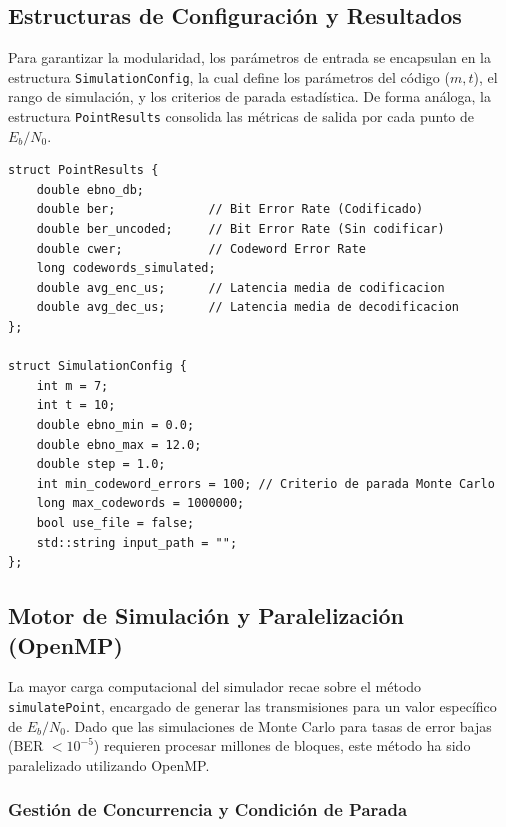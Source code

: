\subsection{Estructuras de Configuración y Resultados}

Para garantizar la modularidad, los parámetros de entrada se encapsulan en la estructura \texttt{SimulationConfig}, la cual define los parámetros del código ($m, t$), el rango de simulación, y los criterios de parada estadística. De forma análoga, la estructura \texttt{PointResults} consolida las métricas de salida por cada punto de $E_b/N_0$.

\begin{lstlisting}[style=CodigoCPP, caption={Definición de las estructuras \texttt{PointResults} y \texttt{SimulationConfig}, encargadas de almacenar las métricas de rendimiento y los parámetros de ejecución del simulador.}, label={lst:estructuras_simulacion}]
struct PointResults { 
    double ebno_db; 
    double ber;             // Bit Error Rate (Codificado)
    double ber_uncoded;     // Bit Error Rate (Sin codificar)
    double cwer;            // Codeword Error Rate
    long codewords_simulated; 
    double avg_enc_us;      // Latencia media de codificacion
    double avg_dec_us;      // Latencia media de decodificacion
};

struct SimulationConfig { 
    int m = 7; 
    int t = 10; 
    double ebno_min = 0.0; 
    double ebno_max = 12.0; 
    double step = 1.0; 
    int min_codeword_errors = 100; // Criterio de parada Monte Carlo
    long max_codewords = 1000000; 
    bool use_file = false;
    std::string input_path = ""; 
};
\end{lstlisting}

\subsection{Motor de Simulación y Paralelización (OpenMP)}

La mayor carga computacional del simulador recae sobre el método \texttt{simulatePoint}, encargado de generar las transmisiones para un valor específico de $E_b/N_0$. Dado que las simulaciones de Monte Carlo para tasas de error bajas (BER $< 10^{-5}$) requieren procesar millones de bloques, este método ha sido paralelizado utilizando OpenMP.

\subsubsection{Gestión de Concurrencia y Condición de Parada}

